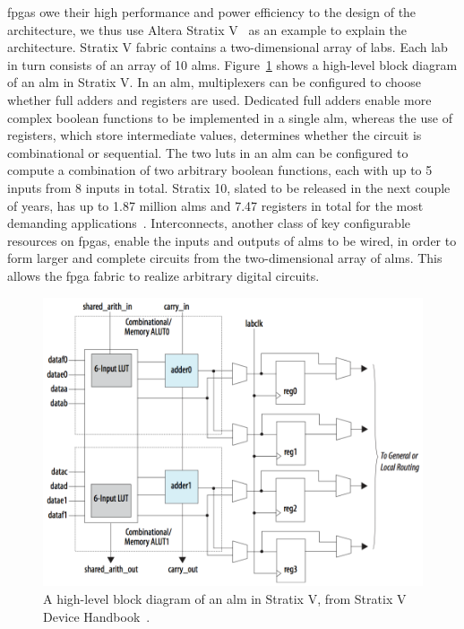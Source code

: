 \Glspl{fpga} owe their high performance and power efficiency to the design of
the architecture, we thus use Altera Stratix V~\cite{stratix5} as an example to
explain the architecture.  Stratix V fabric contains a two-dimensional array of
\glspl{lab}.  Each \gls{lab} in turn consists of an array of 10 \glspl{alm}.
Figure~\ref{bg:fig:alm} shows a high-level block diagram of an \gls{alm} in
Stratix V.  In an \gls{alm}, multiplexers can be configured to choose whether
full adders and registers are used.  Dedicated full adders enable more complex
boolean functions to be implemented in a single \gls{alm}, whereas the use of
registers, which store intermediate values, determines whether the circuit
is combinational or sequential.  The two \glspl{lut} in an \gls{alm} can be
configured to compute a combination of two arbitrary boolean functions, each
with up to 5 inputs from 8 inputs in total.  Stratix 10, slated to be released
in the next couple of years, has up to 1.87 million \glspl{alm} and 7.47
registers in total for the most demanding applications~\cite{stratix10stat}.
Interconnects, another class of key configurable resources on \glspl{fpga},
enable the inputs and outputs of \glspl{alm} to be wired, in order to form
larger and complete circuits from the two-dimensional array of \glspl{alm}.
This allows the \gls{fpga} fabric to realize arbitrary digital circuits.
\begin{figure}[ht]
    \centering
    \includegraphics[width=0.8\linewidth]{bg/fig/alm.png}
    \caption{%
        A high-level block diagram of an \gls{alm} in Stratix V, from Stratix V
        Device Handbook~\cite{stratix5}.
    }\label{bg:fig:alm}
\end{figure}



